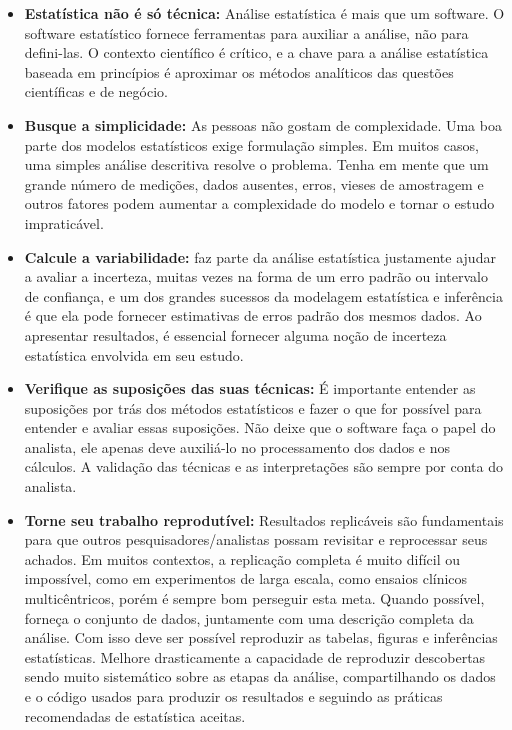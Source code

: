 \documentclass[12pt,]{style/krantz}
\theoremstyle{definition}
\theoremstyle{definition}
\theoremstyle{definition}
\theoremstyle{remark}
\begin{document}
\begin{itemize}
\item
  \textbf{Estatística não é só técnica:} Análise estatística é mais que um software. O software estatístico fornece ferramentas para auxiliar a análise, não para defini-las. O contexto científico é crítico, e a chave para a análise estatística baseada em princípios é aproximar os métodos analíticos das questões científicas e de negócio.
\item
  \textbf{Busque a simplicidade:} As pessoas não gostam de complexidade. Uma boa parte dos modelos estatísticos exige formulação simples. Em muitos casos, uma simples análise descritiva resolve o problema. Tenha em mente que um grande número de medições, dados ausentes, erros, vieses de amostragem e outros fatores podem aumentar a complexidade do modelo e tornar o estudo impraticável.
\item
  \textbf{Calcule a variabilidade:} faz parte da análise estatística justamente ajudar a avaliar a incerteza, muitas vezes na forma de um erro padrão ou intervalo de confiança, e um dos grandes sucessos da modelagem estatística e inferência é que ela pode fornecer estimativas de erros padrão dos mesmos dados. Ao apresentar resultados, é essencial fornecer alguma noção de incerteza estatística envolvida em seu estudo.
\item
  \textbf{Verifique as suposições das suas técnicas:} É importante entender as suposições por trás dos métodos estatísticos e fazer o que for possível para entender e avaliar essas suposições. Não deixe que o software faça o papel do analista, ele apenas deve auxiliá-lo no processamento dos dados e nos cálculos. A validação das técnicas e as interpretações são sempre por conta do analista.
\item
  \textbf{Torne seu trabalho reprodutível:} Resultados replicáveis são fundamentais para que outros pesquisadores/analistas possam revisitar e reprocessar seus achados. Em muitos contextos, a replicação completa é muito difícil ou impossível, como em experimentos de larga escala, como ensaios clínicos multicêntricos, porém é sempre bom perseguir esta meta. Quando possível, forneça o conjunto de dados, juntamente com uma descrição completa da análise. Com isso deve ser possível reproduzir as tabelas, figuras e inferências estatísticas. Melhore drasticamente a capacidade de reproduzir descobertas sendo muito sistemático sobre as etapas da análise, compartilhando os dados e o código usados para produzir os resultados e seguindo as práticas recomendadas de estatística aceitas.
\end{itemize}
\end{document}

